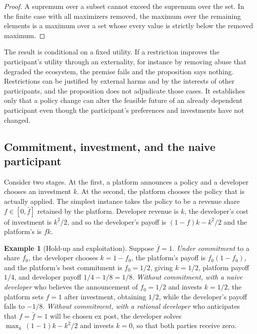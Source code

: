 \documentclass[11pt]{article}
\theoremstyle{definition}
\newtheorem{example}{Example}
\theoremstyle{remark}
\begin{document}
\begin{proof}
A supremum over a subset cannot exceed the supremum over the set. In the finite case with all maximizers removed, the maximum over the remaining elements is a maximum over a set whose every value is strictly below the removed maximum.
\end{proof}

The result is conditional on a fixed utility. If a restriction improves the participant's utility through an externality, for instance by removing abuse that degraded the ecosystem, the premise fails and the proposition says nothing. Restrictions can be justified by external harms and by the interests of other participants, and the proposition does not adjudicate those cases. It establishes only that a policy change can alter the feasible future of an already dependent participant even though the participant's preferences and investments have not changed.

\subsection{Commitment, investment, and the naive participant}

Consider two stages. At the first, a platform announces a policy and a developer chooses an investment $k$. At the second, the platform chooses the policy that is actually applied. The simplest instance takes the policy to be a revenue share $f\in[0,\bar f]$ retained by the platform. Developer revenue is $k$, the developer's cost of investment is $k^2/2$, and so the developer's payoff is $(1-f)k-k^2/2$ and the platform's is $fk$.

\begin{example}[Hold-up and exploitation]\label{ex:holdup}
Suppose $\bar f=1$. \emph{Under commitment} to a share $f_0$, the developer chooses $k=1-f_0$, the platform's payoff is $f_0(1-f_0)$, and the platform's best commitment is $f_0=1/2$, giving $k=1/2$, platform payoff $1/4$, and developer payoff $1/4-1/8=1/8$. \emph{Without commitment, with a naive developer} who believes the announcement of $f_0=1/2$ and invests $k=1/2$, the platform sets $f=1$ after investment, obtaining $1/2$, while the developer's payoff falls to $-1/8$. \emph{Without commitment, with a rational developer} who anticipates that $f=\bar f=1$ will be chosen ex post, the developer solves $\max_k\,(1-1)k-k^2/2$ and invests $k=0$, so that both parties receive zero.
\end{example}
\end{document}

